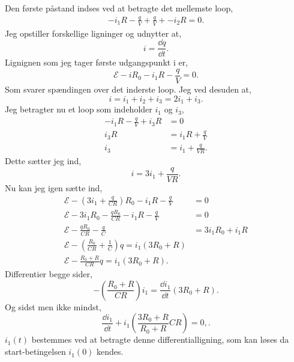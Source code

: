 \begin{solution}
Den første påstand indses ved at betragte det mellemste loop,
\begin{align*}
	-i_1R - \frac{q}{V} + \frac{q}{V} + -i_2R = 0
.\end{align*}
Jeg opstiller forskellige ligninger og udnytter at,
\[
i = \frac{\dd q}{\dd t}
.\]
Lignignen som jeg tager første udgangspunkt i er,
\[
\mathcal{E} - iR_0 - i_1R - \frac{q}{V} = 0
.\] 
Som svarer spændingen over det inderste loop. Jeg ved desuden at,
\[
i = i_1 + i_2 + i_3 = 2i_1 + i_3
.\] 
Jeg betragter nu et loop som indeholder $i_1$ og $i_3$,
\begin{align*}
	-i_1R -\frac{q}{V} + i_3R &= 0  \\
	i_3R &= i_1R + \frac{q}{V} \\
	i_3 &= i_1 + \frac{q}{VR}
.\end{align*}
Dette sætter jeg ind,
\[
i = 3i_1 + \frac{q}{VR}
.\] 
Nu kan jeg igen sætte ind,
\begin{align*}
	\mathcal{E} - \left( 3i_1 + \frac{q}{CR} \right) R_0 - i_1R-\frac{q}{V}&=0 \\
	\mathcal{E} - 3i_1R_0 - \frac{qR_0}{CR}-i_1R-\frac{q}{V}&= 0 \\
	\mathcal{E} - \frac{qR_0}{CR}-\frac{q}{C} &=  3i_1R_0 + i_1R \\
        \mathcal{E} - \left( \frac{R_0}{CR} + \frac{1}{C} \right)q = i_1\left( 3R_0 + R \right)\\
	\mathcal{E} - \frac{R_0+R}{CR}q = i_1\left( 3R_0+R \right) 
.\end{align*}
Differentier begge sider,
\[
-\left(\frac{R_0+R}{CR}  \right) i_1 = \frac{\dd i_1}{\dd t}\left( 3R_0+R \right) 
.\]
Og sidst men ikke mindst,
\[
\frac{\dd i_1}{\dd t} + i_1\left( \frac{3R_0+R}{R_0+R}CR \right) = 0,
.\] 
$i_1\left( t \right) $ bestemmes ved at betragte denne differentialligning, som kan løses da start-betingelsen $i_1\left( 0 \right) $ kendes.
\end{solution}

